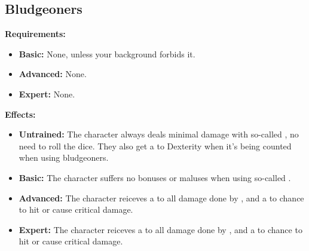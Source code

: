\documentclass[openany,10pt,a4paper]{book}
\begin{document}
\subsection{Bludgeoners}
\begin{table}[!ht]
\centering
{}
\end{table}
\textbf{Requirements:}
\begin{itemize}
	\item \textbf{Basic:} None, unless your background forbids it.
	\item \textbf{Advanced:} None.
	\item \textbf{Expert:} None.
\end{itemize}
\textbf{Effects:}
\begin{itemize}
	\item \textbf{Untrained:} The character always deals minimal damage with so-called  , no need to roll the dice. They also get a  to Dexterity when it's being counted when using bludgeoners.
	\item \textbf{Basic:} The character suffers no bonuses or maluses when using so-called  .
	\item \textbf{Advanced:} The character reiceves a  to all damage done by  , and a  to chance to hit or cause critical damage.
	\item \textbf{Expert:} The character reiceves a  to all damage done by  , and a  to chance to hit or cause critical damage.
\end{itemize}\newpage
\end{document}
